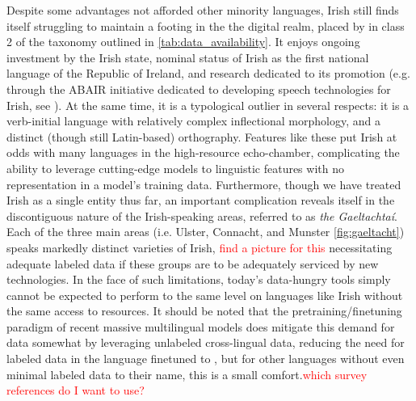 \documentclass[thesis]{cluu}
\newcommand{\todo}[1]{\textcolor{red}{#1}}
\begin{document}
Despite some advantages not afforded other minority languages, Irish still finds itself struggling to maintain a footing in the the digital realm, placed by \textcite{joshiStateFateLinguistic2021} in class 2 of the taxonomy outlined in \cref{tab:data_availability}. It enjoys ongoing investment by the Irish state, nominal status of Irish as the first national language of the Republic of Ireland, and research dedicated to its promotion (e.g. through the ABAIR initiative dedicated to developing speech technologies for Irish, see \parencite{chasaideABAIRInitiativeBringing2017}). At the same time, it is a typological outlier in several respects: it is a verb-initial language with relatively complex inflectional morphology, and a distinct (though still Latin-based) orthography. Features like these put Irish at odds with many languages in the high-resource echo-chamber, complicating the ability to leverage cutting-edge models to linguistic features with no representation in a model's training data. Furthermore, though we have treated Irish as a single entity thus far, an important complication reveals itself in the discontiguous nature of the Irish-speaking areas, referred to as \textit{the Gaeltachtaí}. Each of the three main areas (i.e. Ulster, Connacht, and Munster \ref{fig:gaeltacht}) speaks markedly distinct varieties of Irish, \todo{find a picture for this} necessitating adequate labeled data if these groups are to be adequately serviced by new technologies. In the face of such limitations, today's data-hungry tools simply cannot be expected to perform to the same level on languages like Irish without the same access to resources. It should be noted that the pretraining/finetuning paradigm of recent massive multilingual models does mitigate this demand for data somewhat by leveraging unlabeled cross-lingual data, reducing the need for labeled data in the language finetuned to \parencite{hedderichSurveyRecentApproaches2021,ranathungaNeuralMachineTranslation2021,joshiStateFateLinguistic2021}, but for other languages without even minimal labeled data to their name, this is a small comfort.\todo{which survey references do I want to use?}
\end{document}
